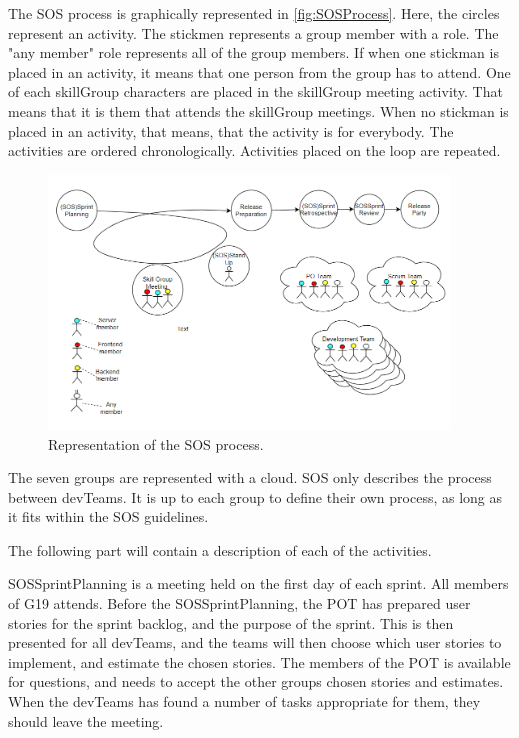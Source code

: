 The SOS process is graphically represented in \autoref{fig:SOSProcess}. Here, the circles represent an activity. The stickmen represents a group member with a role. The "any member" role represents all of the group members. If when one stickman is placed in an activity, it means that one person from the group has to attend. 
One of each \gls{skillGroup} characters are placed in the \gls{skillGroup} meeting activity. That means that it is them that attends the \gls{skillGroup} meetings.
When no stickman is placed in an activity, that means, that the activity is for everybody. 
The activities are ordered chronologically. Activities placed on the loop are repeated.

\begin{figure}[h]
    \begin{center}
        \includegraphics[width=0.95\textwidth]{figures/SOSProcess}
    \end{center}
    \caption{Representation of the \gls{SOS} process.}
    \label{fig:SOSProcess}
\end{figure}

The seven groups are represented with a cloud. \gls{SOS} only describes the process between \glspl{devTeam}. It is up to each group to define their own process, as long as it fits within the \gls{SOS} guidelines. 

The following part will contain a description of each of the activities.

\Gls{SOSSprintPlanning} is a meeting held on the first day of each sprint. All members of \Gls{G19} attends. Before the \Gls{SOSSprintPlanning}, the \gls{POT} has prepared user stories for the sprint backlog, and the purpose of the sprint. 
This is then presented for all \glspl{devTeam}, and the teams will then choose which user stories to implement, and estimate the chosen stories. 
The members of the \gls{POT} is available for questions, and needs to accept the other groups chosen stories and estimates. 
When the \glspl{devTeam} has found a number of tasks appropriate for them, they should leave the meeting. 
 
